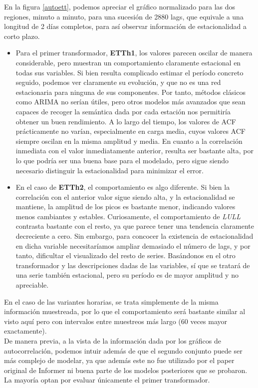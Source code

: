 En la figura \ref{autoett}, podemos apreciar el gráfico normalizado para las dos regiones, minuto a minuto, para una sucesión de 2880 lags, que equivale a una longitud de 2 días completos, para así observar información de estacionalidad a corto plazo.

\begin{itemize}
	\item Para el primer transformador, \textbf{ETTh1}, los valores parecen oscilar de manera considerable, pero muestran un comportamiento claramente estacional en todas sus variables. Si bien resulta complicado estimar el período concreto seguido, podemos ver claramente su evolución, y que no es una red estacionaria para ninguna de sus componentes. Por tanto, métodos clásicos como ARIMA no serían útiles, pero otros modelos más avanzados que sean capaces de recoger la semántica dada por cada estación nos permitiría obtener un buen rendimiento. A lo largo del tiempo, los valores de ACF prácticamente no varían, especialmente en carga media, cuyos valores ACF siempre oscilan en la misma amplitud y media. En cuanto a la correlación inmediata con el valor inmediatamente anterior, resulta ser bastante alta, por lo que podría ser una buena base para el modelado, pero sigue siendo necesario distinguir la estacionalidad para minimizar el error.
	\item En el caso de \textbf{ETTh2}, el comportamiento es algo diferente. Si bien la correlación con el anterior valor sigue siendo alta, y la estacionalidad se mantiene, la amplitud de los picos es bastante menor, indicando valores menos cambiantes y estables. Curiosamente, el comportamiento de \textit{LULL} contrasta bastante con el resto, ya que parece tener una tendencia claramente decreciente a cero. Sin embargo, para concocer la existencia de estacionalidad en dicha variable necesitaríamos ampliar demasiado el número de lags, y por tanto, dificultar el visualizado del resto de series. Basándonos en el otro transformador y las descripciones dadas de las variables, sí que se tratará de una serie también estacional, pero su período es de mayor amplitud y no apreciable.
\end{itemize}

En el caso de las variantes horarias, se trata simplemente de la misma información muestreada, por lo que el comportamiento será bastante similar al visto aquí pero con intervalos entre muestreos más largo (60 veces mayor exactamente).\\

De manera previa, a la vista de la información dada por los gráficos de autocorrelación, podemos intuir además de que el segundo conjunto puede ser más complejo de modelar, ya que además este no fue utilizado por el paper original de Informer ni buena parte de los modelos posteriores que se probaron. La mayoría optan por evaluar únicamente el primer transformador.
